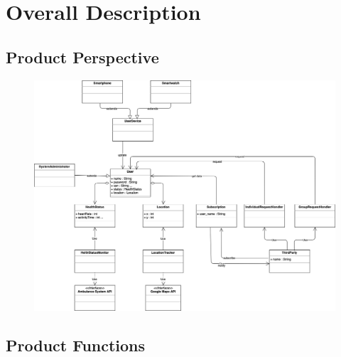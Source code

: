 \documentclass[12pt,a4paper]{article}
\begin{document}
	\newpage
	\section{Overall Description}
	
		\subsection{Product Perspective}
		
		\begin{figure}[h]
			\centering
			\includegraphics[width=1.0\linewidth]{Images/first-UML}
			\caption{}
			\label{fig:first-uml}
		\end{figure}
		
		
		\subsection{Product Functions}
		
\end{document}
